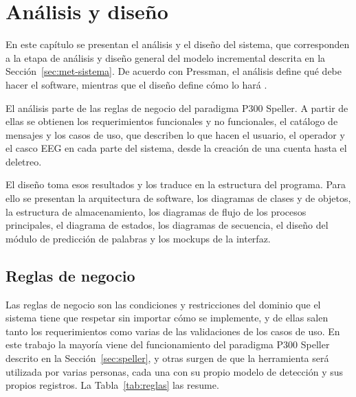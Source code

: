 \chapter[ANÁLISIS Y DISEÑO]{Análisis y diseño}
\label{cap:analisis-diseno}

En este capítulo se presentan el análisis y el diseño del sistema, que corresponden a la etapa de
análisis y diseño general del modelo incremental descrita en la Sección~\ref{sec:met-sistema}. De
acuerdo con Pressman, el análisis define qué debe hacer el software, mientras que el diseño define
cómo lo hará \cite{pressman2010}.

El análisis parte de las reglas de negocio del paradigma P300 Speller. A partir de ellas se obtienen
los requerimientos funcionales y no funcionales, el catálogo de mensajes y los casos de uso, que
describen lo que hacen el usuario, el operador y el casco EEG en cada parte del sistema, desde la
creación de una cuenta hasta el deletreo.

El diseño toma esos resultados y los traduce en la estructura del programa. Para ello se presentan
la arquitectura de software, los diagramas de clases y de objetos, la estructura de almacenamiento,
los diagramas de flujo de los procesos principales, el diagrama de estados, los diagramas de
secuencia, el diseño del módulo de predicción de palabras y los mockups de la interfaz.

\section[REGLAS DE NEGOCIO]{Reglas de negocio}

Las reglas de negocio son las condiciones y restricciones del dominio que el sistema tiene que
respetar sin importar cómo se implemente, y de ellas salen tanto los requerimientos como varias de
las validaciones de los casos de uso. En este trabajo la mayoría viene del funcionamiento del
paradigma P300 Speller descrito en la Sección~\ref{sec:speller}, y otras surgen de que la
herramienta será utilizada por varias personas, cada una con su propio modelo de detección y sus
propios registros. La Tabla~\ref{tab:reglas} las resume.

